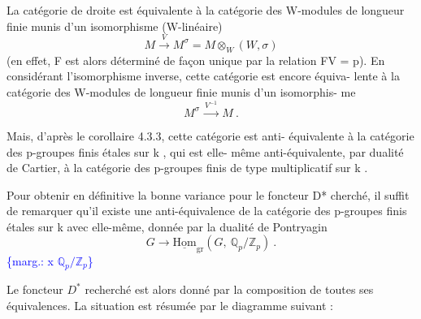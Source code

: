 \documentclass[11pt]{article}
\newcommand{\scanpage}[1]{\par\bigskip\noindent{\small\sffamily[scan #1]}\par}
\newcommand{\mspage}[1]{{\small\sffamily[p.\,#1]}}
\newcommand{\hand}[1]{\textcolor{blue}{#1}}
\newcommand{\margin}[1]{\textcolor{blue}{\{\textsf{marg.:} #1\}}}
\begin{document}
La catégorie de droite est équivalente à la catégorie des
W-modules de longueur finie munis d'un isomorphisme (W-linéaire)
\[ M \xrightarrow{\ V\ } M^{\sigma} = M \otimes_{W} (W,\sigma) \]
(en effet, F est alors déterminé de façon unique par la relation FV = p).
En considérant l'isomorphisme inverse, cette catégorie est encore équiva-%
lente à la catégorie des W-modules de longueur finie munis d'un isomorphis-%
me
\[ M^{\sigma} \xrightarrow{\ V^{-1}\ } M \ . \]

Mais, d'après le corollaire 4.3.3, cette catégorie est anti-%
équivalente à la catégorie des p-groupes finis étales sur k , qui est elle-%
même anti-équivalente, par dualité de Cartier, à la catégorie des p-groupes
finis de type multiplicatif sur k .

Pour obtenir en définitive la bonne variance pour le foncteur
D* cherché, il suffit de remarquer qu'il existe une anti-équivalence de
la catégorie des p-groupes finis étales sur k avec elle-même, donnée par
la dualité de Pontryagin
\[ G \to \underline{\mathrm{Hom}}_{\mathrm{gr}}(G,\ \mathbb{Q}_{p}/\mathbb{Z}_{p}) \ . \]
\margin{x $\mathbb{Q}_p/\mathbb{Z}_p$}

\mspage{\hand{45}}

\clearpage
\scanpage{129/46}
\mspage{II.18}

Le foncteur $D^*$ recherché est alors donné par la composition
de toutes ses équivalences. La situation est résumée par le diagramme
suivant :
\end{document}

